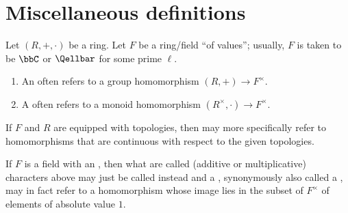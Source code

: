 \appendix

\section{Miscellaneous definitions}



\begin{definition} \label{definition:additive_and_multiplicative_characters_of_a_ring}
    Let $(R,+,\cdot)$ be a ring. Let $F$ be a ring/field ``of values''; usually, $F$ is taken to be $\bbC$ or $\Qellbar$ for some prime $\ell$.
    \begin{enumerate}
        \item An  often refers to a group homomorphism $(R,+) \to F^\times$. 
        \item A  often refers to a monoid homomorphism $(R^\times, \cdot) \to F^\times$.
    \end{enumerate}
    If $F$ and $R$ are equipped with topologies, then  may more specifically refer to homomorphisms that are continuous with respect to the given topologies.

    If $F$ is a field with an , then what are called (additive or multiplicative) characters above may just be called  instead and a , synonymously also called a , may in fact refer to a homomorphism whose image lies in the subset of $F^\times$ of elements of absolute value $1$. 

\end{definition}